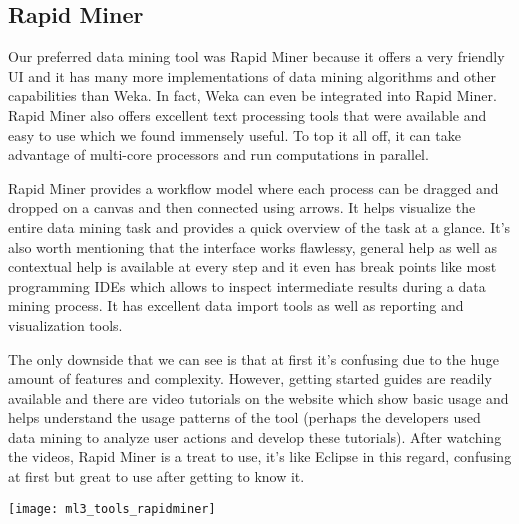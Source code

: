 \subsection{Rapid Miner} %
\label{sub:Rapid Miner}
Our preferred data mining tool was Rapid Miner because it offers a very friendly UI and it has many more implementations of data mining algorithms and other capabilities than Weka. In fact, Weka can even be integrated into Rapid Miner. Rapid Miner also offers excellent text processing tools that were available and easy to use which we found immensely useful. To top it all off, it can take advantage of multi-core processors and run computations in parallel.

Rapid Miner provides a workflow model where each process can be dragged and dropped on a canvas and then connected using arrows. It helps visualize the entire data mining task and provides a quick overview of the task at a glance. It's also worth mentioning that the interface works flawlessy, general help as well as contextual help is available at every step and it even has break points like most programming IDEs which allows to inspect intermediate results during a data mining process. It has excellent data import tools as well as reporting and visualization tools.

The only downside that we can see is that at first it's confusing due to the huge amount of features and complexity. However, getting started guides are readily available and there are video tutorials on the website which show basic usage and helps understand the usage patterns of the tool (perhaps the developers used data mining to analyze user actions and develop these tutorials). After watching the videos, Rapid Miner is a treat to use, it's like Eclipse in this regard, confusing at first but great to use after getting to know it.

\texttt{[image: ml3\_tools\_rapidminer]}

